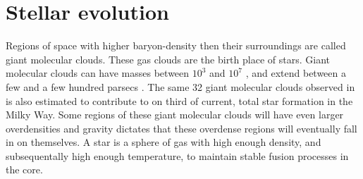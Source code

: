\section{Stellar evolution}






Regions of space with higher baryon-density then their surroundings are called giant molecular clouds.
These gas clouds are the birth place of stars.
Giant molecular clouds can have masses between $10^3$ and $10^7$ \msol, and extend between a few and a few hundred parsecs .
The same 32 giant molecular clouds observed in  is also estimated to contribute to on third of current, total star formation in the Milky Way.
Some regions of these giant molecular clouds will have even larger overdensities and gravity dictates that these overdense regions will eventually fall in on themselves.
A star is a sphere of gas with high enough density, and subsequentally high enough temperature, to maintain stable fusion processes in the core.

